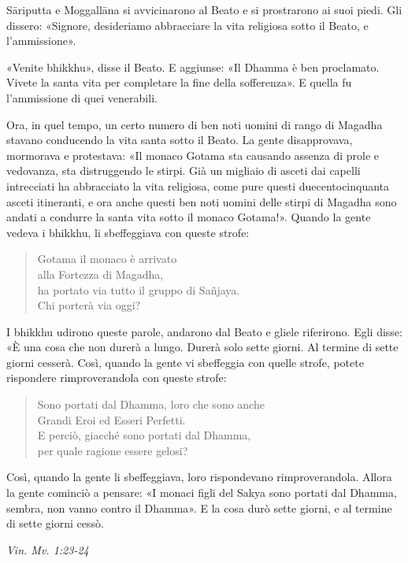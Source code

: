 Sāriputta e Moggallāna si avvicinarono al Beato e si prostrarono ai suoi
piedi. Gli dissero: «Signore, desideriamo abbracciare la vita religiosa
sotto il Beato, e l’ammissione».


«Venite bhikkhu», disse il Beato. E aggiunse: «Il Dhamma è ben
proclamato. Vivete la santa vita per completare la fine della
sofferenza». E quella fu l’ammissione di quei venerabili.


Ora, in quel tempo, un certo numero di ben noti uomini di rango di
Magadha stavano conducendo la vita santa sotto il Beato. La gente
disapprovava, mormorava e protestava: «Il monaco Gotama sta causando
assenza di prole e vedovanza, sta distruggendo le stirpi. Già un
migliaio di asceti dai capelli intrecciati ha abbracciato la vita
religiosa, come pure questi duecentocinquanta asceti itineranti, e ora
anche questi ben noti uomini delle stirpi di Magadha sono andati a
condurre la santa vita sotto il monaco Gotama!». Quando la gente vedeva
i bhikkhu, li sbeffeggiava con queste strofe:


\begin{quotation}
Gotama il monaco è arrivato \\
alla Fortezza di Magadha, \\
ha portato via tutto il gruppo di Sañjaya. \\
Chi porterà via oggi?
\end{quotation}

I bhikkhu udirono queste parole, andarono dal Beato e gliele riferirono.
Egli disse: «È una cosa che non durerà a lungo. Durerà solo sette
giorni. Al termine di sette giorni cesserà. Così, quando la gente vi
sbeffeggia con quelle strofe, potete rispondere rimproverandola con
queste strofe:


\begin{quotation}
Sono portati dal Dhamma, loro che sono anche \\
Grandi Eroi ed Esseri Perfetti. \\
E perciò, giacché sono portati dal Dhamma, \\
per quale ragione essere gelosi?
\end{quotation}

Così, quando la gente li sbeffeggiava, loro rispondevano
rimproverandola. Allora la gente cominciò a pensare: «I monaci figli del
Sakya sono portati dal Dhamma, sembra, non vanno contro il Dhamma». E la
cosa durò sette giorni, e al termine di sette giorni cessò.


\emph{Vin. Mv. 1:23-24}


